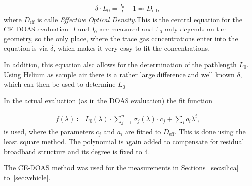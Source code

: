 \begin{align}
  \delta \cdot L_0 = \frac{I_0}{I} - 1 \eqqcolon D_{\text{eff}}, \label{eq:ce-central}
\end{align}
where $D_{\text{eff}}$ is calle \emph{Effective Optical Density}.This
is the central equation for the CE-DOAS evaluation. $I$ and $I_0$ are
measured and $L_0$ only depends on the geometry, so the only place, where
the trace gas concentrations enter into the equation is via $\delta$, which makes
it very easy to fit the concentrations.

In addition, this equation also allows for the determination of the
pathlength $L_0$. Using Helium as sample air there is a rather large
difference and well known $\delta$, which can then be used to determine
$L_0$.

In the actual evaluation (as in the DOAS evaluation) the fit function

\begin{align*}
  f(\lambda) \coloneqq L_0(\lambda)\cdot\sum_{j=1}^n \sigma_j(\lambda)
  \cdot c_j + \sum_i a_i \lambda^i,
\end{align*}
is used, where the parameters $c_j$ and $a_i$ are fitted to
$D_{\text{eff}}$. This is done using the least square method. The
polynomial is again added to compensate for residual broadband
structure and its degree is fixed to \num{4}.

The CE-DOAS method was used for the measurements in
Sections~\ref{sec:silica} to~\ref{sec:vehicle}. 

